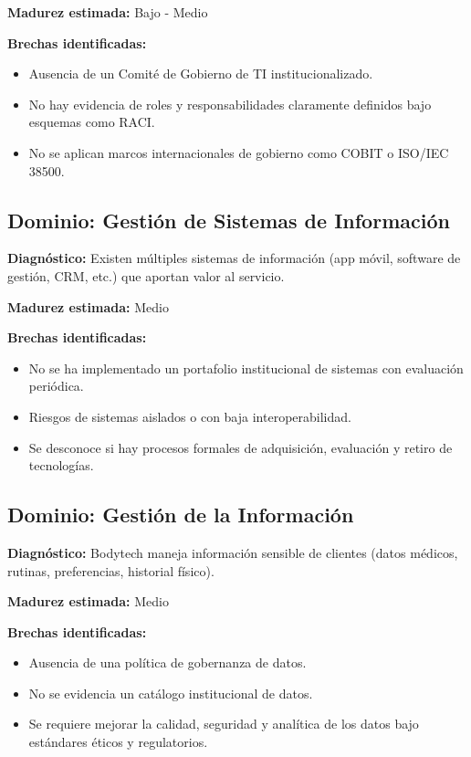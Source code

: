 \textbf{Madurez estimada:} Bajo - Medio

\textbf{Brechas identificadas:}
\begin{itemize}
  \item Ausencia de un Comité de Gobierno de TI institucionalizado.
  \item No hay evidencia de roles y responsabilidades claramente definidos bajo esquemas como RACI.
  \item No se aplican marcos internacionales de gobierno como COBIT o ISO/IEC 38500.
\end{itemize}

\subsection{Dominio: Gestión de Sistemas de Información}

\textbf{Diagnóstico:} Existen múltiples sistemas de información (app móvil, software de gestión, CRM, etc.) que aportan valor al servicio.

\textbf{Madurez estimada:} Medio

\textbf{Brechas identificadas:}
\begin{itemize}
  \item No se ha implementado un portafolio institucional de sistemas con evaluación periódica.
  \item Riesgos de sistemas aislados o con baja interoperabilidad.
  \item Se desconoce si hay procesos formales de adquisición, evaluación y retiro de tecnologías.
\end{itemize}

\subsection{Dominio: Gestión de la Información}

\textbf{Diagnóstico:} Bodytech maneja información sensible de clientes (datos médicos, rutinas, preferencias, historial físico).

\textbf{Madurez estimada:} Medio

\textbf{Brechas identificadas:}
\begin{itemize}
  \item Ausencia de una política de gobernanza de datos.
  \item No se evidencia un catálogo institucional de datos.
  \item Se requiere mejorar la calidad, seguridad y analítica de los datos bajo estándares éticos y regulatorios.
\end{itemize}

